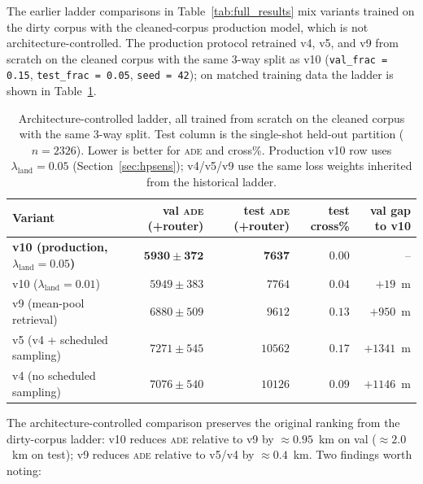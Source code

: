 \documentclass[oneside, a4paper, onecolumn, 11pt]{article}
\newcommand{\ade}{\textsc{ade}}
\begin{document}
The earlier ladder comparisons in Table~\ref{tab:full_results} mix
variants trained on the dirty corpus with the cleaned-corpus
production model, which is not architecture-controlled.  The
production protocol retrained v4, v5, and v9 from scratch on the
cleaned corpus with the same $3$-way split as v10
(\texttt{val\_frac = 0.15}, \texttt{test\_frac = 0.05},
\texttt{seed = 42}); on matched training data the ladder is shown in
Table~\ref{tab:ladder_clean}.

\begin{table}[h]
\centering
\caption{Architecture-controlled ladder, all trained from scratch on
the cleaned corpus with the same 3-way split.  Test column is the
single-shot held-out partition ($n = 2326$). Lower is better for
\ade{} and cross\%.  Production v10 row uses
$\lambda_{\mathrm{land}} = 0.05$ (Section~\ref{sec:hpsens});
v4/v5/v9 use the same loss weights inherited from the historical
ladder.}
\label{tab:ladder_clean}
\begin{tabular}{lrrrr}
\toprule
\textbf{Variant} & val \ade{} (+router) & test \ade{} (+router) & test cross\% & val gap to v10 \\
\midrule
\textbf{v10 (production, $\lambda_{\mathrm{land}} = 0.05$)} & $\mathbf{5930 \pm 372}$ & $\mathbf{7637}$ & $\mathbf{0.00}$ & -- \\
v10 ($\lambda_{\mathrm{land}} = 0.01$)   & $5949 \pm 383$ & $7764$ & $0.04$ & $+19$~m \\
v9 (mean-pool retrieval)            & $6880 \pm 509$ & $9612$ & $0.13$ & $+950$~m \\
v5 (v4 + scheduled sampling)        & $7271 \pm 545$ & $10562$ & $0.17$ & $+1341$~m \\
v4 (no scheduled sampling)          & $7076 \pm 540$ & $10126$ & $0.09$ & $+1146$~m \\
\bottomrule
\end{tabular}
\end{table}

The architecture-controlled comparison preserves the original
ranking from the dirty-corpus ladder: v10 reduces \ade{} relative to
v9 by $\approx 0.95$~km on val ($\approx 2.0$~km on test); v9
reduces \ade{} relative to v5/v4 by $\approx 0.4$~km.  Two findings
worth noting:
\end{document}
